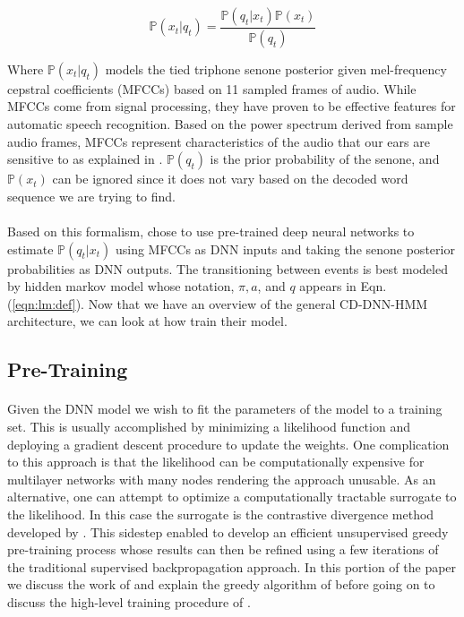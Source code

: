 \documentclass[letterpaper]{article}
\newcommand{\cprob}[2]{ \prob{#1 \lvert #2} }
\newcommand{\prob}[1]{\mathbb{P}\left( #1 \right)}
\begin{document}
\begin{equation*}
	\cprob{x_t}{q_t} = \frac{\cprob{q_t}{x_t} \prob{x_t}}{\prob{q_t}}
	\label{eqn:senone:def}	
\end{equation*}

Where $\cprob{x_t}{q_t}$ models the tied triphone senone posterior given mel-frequency cepstral coefficients (MFCCs) based on 11 sampled frames of audio. While MFCCs come from signal processing, they have proven to be effective features for automatic speech recognition. Based on the power spectrum derived from sample audio frames, MFCCs 
represent characteristics of the audio that our ears are sensitive to as explained in \cite{adami2010automatic}.  $\prob{q_t}$ is the prior probability of the senone, and $\prob{x_t}$ can be ignored since it does not vary based on the decoded word sequence we are trying to find.

\paragraph{} Based on this formalism, \cite{DBLP:journals/taslp/DahlYDA12} chose to use pre-trained deep neural networks to estimate $\cprob{q_t}{x_t}$ using MFCCs as DNN inputs and taking the senone posterior probabilities as DNN outputs. The transitioning between events is best modeled by hidden markov model whose notation, $\pi, a$, and $q$ appears in Eqn. (\ref{eqn:lm:def}). Now that we have an overview of the general CD-DNN-HMM architecture, we can look at how \cite{DBLP:journals/taslp/DahlYDA12} train their model.

\subsection*{Pre-Training}

\paragraph{} Given the DNN model we wish to fit the parameters of the model to a training set. This is usually accomplished by minimizing a likelihood function and deploying a gradient descent procedure to update the weights. One complication to this approach is that the likelihood can be computationally expensive for multilayer networks with many nodes rendering the approach unusable. As an alternative, one can attempt to optimize a computationally tractable surrogate to the likelihood. In this case the surrogate is the contrastive divergence method developed by \cite{DBLP:journals/neco/Hinton02}. This sidestep enabled \cite{DBLP:journals/neco/HintonOT06} to develop an efficient unsupervised greedy pre-training process whose results can then be refined using a few iterations of the traditional supervised backpropagation approach. In this portion of the paper we discuss the work of \cite{DBLP:journals/neco/Hinton02} and explain the greedy algorithm of \cite{DBLP:journals/neco/HintonOT06} before going on to discuss the high-level training procedure of \cite{DBLP:journals/taslp/DahlYDA12}.
\end{document}
